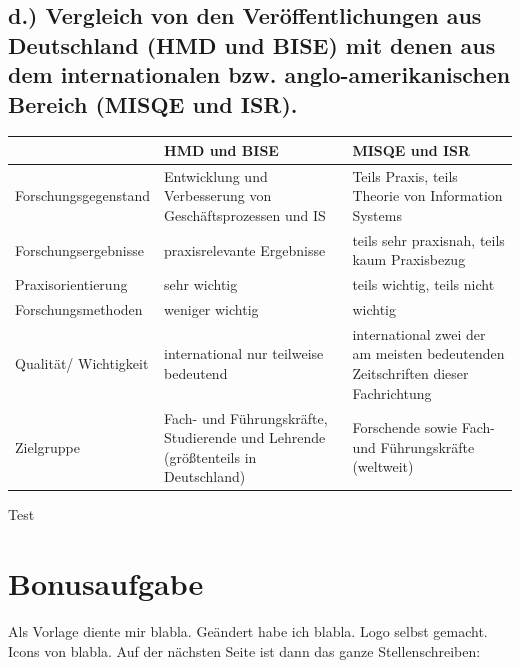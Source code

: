 \documentclass[12pt,utf8]{scrartcl}
\begin{document}
\begin{flushleft}
\subsection{\label{sub4:einfuehrung}d.) Vergleich von den Veröffentlichungen aus Deutschland (HMD und BISE) mit denen aus dem internationalen bzw. anglo-amerikanischen Bereich (MISQE und ISR).}

\begin{tabular}{|p{4cm}|p{5.5cm}|p{5.5cm}|}
\hline
& HMD und BISE & MISQE und ISR \\
\hline
Forschungsgegenstand & Entwicklung und Verbesserung von Geschäftsprozessen und IS & Teils Praxis, teils Theorie von Information Systems \\
\hline
Forschungsergebnisse & praxisrelevante Ergebnisse & teils sehr praxisnah, teils kaum Praxisbezug \\
\hline
Praxisorientierung & sehr wichtig & teils wichtig, teils nicht \\
\hline
Forschungsmethoden & weniger wichtig & wichtig \\
\hline
Qualität/ Wichtigkeit & international nur teilweise bedeutend & international zwei der am meisten bedeutenden Zeitschriften dieser Fachrichtung \\
\hline
Zielgruppe & Fach- und Führungskräfte, Studierende und Lehrende (größtenteils in Deutschland) & Forschende sowie Fach- und Führungskräfte (weltweit) \\
\hline
\end{tabular}
\newline
\newline
\newline

Test

\section{\label{sec:bonus}Bonusaufgabe}

Als Vorlage diente mir \cite{online1}  blabla. Geändert habe ich blabla. Logo selbst gemacht.
Icons von blabla\cite{online2}. Auf der nächsten Seite ist dann das ganze Stellenschreiben:


\end{flushleft}
\end{document}
